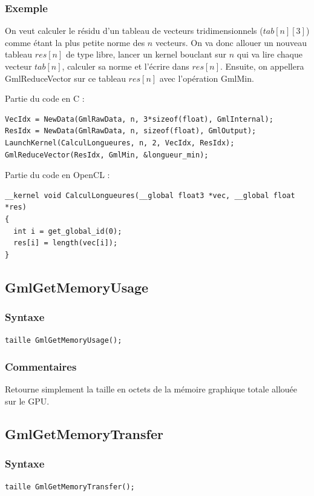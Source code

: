 \documentclass[a4paper,12pt]{article}
\begin{document}
\subsubsection*{Exemple}
On veut calculer le résidu d'un tableau de vecteurs tridimensionnels ($tab[n][3]$) comme étant la plus petite norme des $n$ vecteurs. On va donc allouer un nouveau tableau $res[n]$ de type libre, lancer un kernel bouclant sur $n$ qui va lire chaque vecteur $tab[n]$, calculer sa norme et l'écrire dans $res[n]$. Ensuite, on appellera GmlReduceVector sur ce tableau $res[n]$ avec l'opération GmlMin.

Partie du code en C :

\begin{tt}
\begin{verbatim}
VecIdx = NewData(GmlRawData, n, 3*sizeof(float), GmlInternal);
ResIdx = NewData(GmlRawData, n, sizeof(float), GmlOutput);
LaunchKernel(CalculLongueures, n, 2, VecIdx, ResIdx);
GmlReduceVector(ResIdx, GmlMin, &longueur_min);
\end{verbatim}
\end{tt}
\normalfont

Partie du code en OpenCL :

\begin{tt}
\begin{verbatim}
__kernel void CalculLongueures(__global float3 *vec, __global float *res)
{
  int i = get_global_id(0);
  res[i] = length(vec[i]);
}
\end{verbatim}
\end{tt}
\normalfont


\subsection{GmlGetMemoryUsage}
\subsubsection*{Syntaxe}
{\tt taille GmlGetMemoryUsage();}
\subsubsection*{Commentaires}
Retourne simplement la taille en octets de la mémoire graphique totale allouée sur le GPU.


\subsection{GmlGetMemoryTransfer}
\subsubsection*{Syntaxe}
{\tt taille GmlGetMemoryTransfer();}
\end{document}
